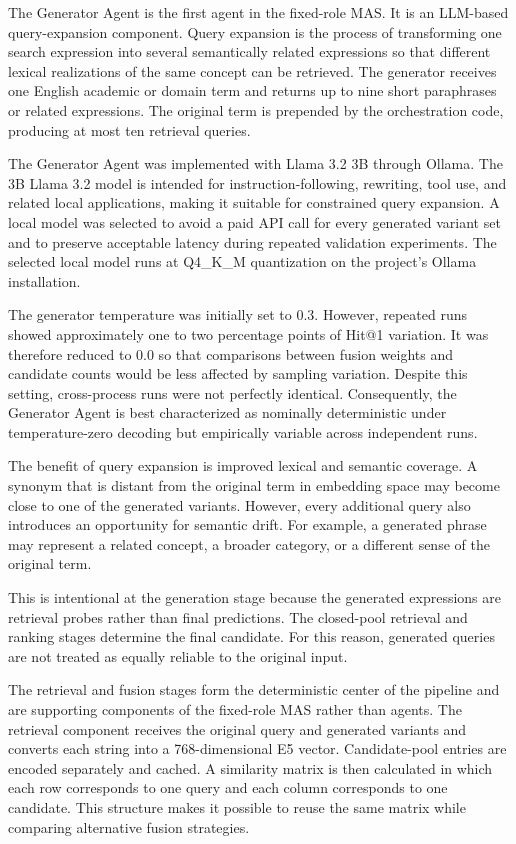 The Generator Agent is the first agent in the fixed-role MAS. It is an LLM-based query-expansion component. Query expansion is the process of transforming one search expression into several semantically related expressions so that different lexical realizations of the same concept can be retrieved. The generator receives one English academic or domain term and returns up to nine short paraphrases or related expressions. The original term is prepended by the orchestration code, producing at most ten retrieval queries.

The Generator Agent was implemented with Llama 3.2 3B through Ollama. The 3B Llama 3.2 model is intended for instruction-following, rewriting, tool use, and related local applications, making it suitable for constrained query expansion. A local model was selected to avoid a paid API call for every generated variant set and to preserve acceptable latency during repeated validation experiments. The selected local model runs at Q4\_K\_M quantization on the project's Ollama installation.

The generator temperature was initially set to 0.3. However, repeated runs showed approximately one to two percentage points of Hit@1 variation. It was therefore reduced to 0.0 so that comparisons between fusion weights and candidate counts would be less affected by sampling variation. Despite this setting, cross-process runs were not perfectly identical. Consequently, the Generator Agent is best characterized as nominally deterministic under temperature-zero decoding but empirically variable across independent runs.

The benefit of query expansion is improved lexical and semantic coverage. A synonym that is distant from the original term in embedding space may become close to one of the generated variants. However, every additional query also introduces an opportunity for semantic drift. For example, a generated phrase may represent a related concept, a broader category, or a different sense of the original term.

This is intentional at the generation stage because the generated expressions are retrieval probes rather than final predictions. The closed-pool retrieval and ranking stages determine the final candidate. For this reason, generated queries are not treated as equally reliable to the original input.

The retrieval and fusion stages form the deterministic center of the pipeline and are supporting components of the fixed-role MAS rather than agents. The retrieval component receives the original query and generated variants and converts each string into a 768-dimensional E5 vector. Candidate-pool entries are encoded separately and cached. A similarity matrix is then calculated in which each row corresponds to one query and each column corresponds to one candidate. This structure makes it possible to reuse the same matrix while comparing alternative fusion strategies.

